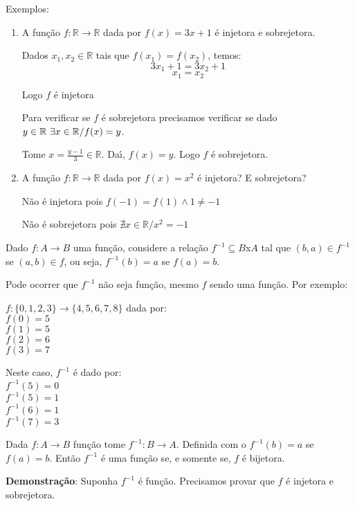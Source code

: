Exemplos:
\begin{enumerate}
\item A fun{\c c}{\~a}o $f:\mathbb{R}\rightarrow\mathbb{R}$ dada por $f(x)=3x+1$ {\'e} injetora e sobrejetora.

Dados $x_{1}, x_{2}\in\mathbb{R}$ tais que $f(x_{1})=f(x_{2})$, temos:
\[3x_{1}+1=3x_{2}+1\]
\[x_{1}=x_{2}\]

Logo $f$ {\'e} injetora

Para verificar se $f$ {\'e} sobrejetora precisamos verificar se dado $y\in\mathbb{R}\\ \ \exists x\in\mathbb{R}/f(x)=y$.

Tome $x=\displaystyle\frac{y-1}{3}\in\mathbb{R}$. Da{\'\i}, $f(x)=y$. Logo $f$ {\'e} sobrejetora.
\item A fun{\c c}{\~a}o $f:\mathbb{R}\rightarrow\mathbb{R}$ dada por $f(x)=x^{2}$ {\'e} injetora? E sobrejetora?

N{\~a}o {\'e} injetora pois $f(-1)=f(1)\wedge 1\neq -1$

N{\~a}o {\'e} sobrejetora pois $\nexists x\in\mathbb{R}/x^{2}=-1$

\end{enumerate}

Dado $f:A\rightarrow B$ uma fun{\c c}{\~a}o, considere a rela{\c c}{\~a}o $f^{-1}\subseteq B$x$A$ tal que $(b,a)\in f^{-1}$ se $(a,b)\in f$, ou seja, $f^{-1}(b)=a$ se $f(a)=b$.

Pode ocorrer que $f^{-1}$ n{\~a}o seja fun{\c c}{\~a}o, mesmo $f$ sendo uma fun{\c c}{\~a}o. Por exemplo:

$f:\{0,1,2,3\}\rightarrow\{4,5,6,7,8\}$ dada por:\\
$f(0)=5$\\
$f(1)=5$\\
$f(2)=6$\\
$f(3)=7$

Neste caso, $f^{-1}$ {\'e} dado por:\\
$f^{-1}(5)=0$\\
$f^{-1}(5)=1$\\
$f^{-1}(6)=1$\\
$f^{-1}(7)=3$

\begin{teorema} Dada $f:A\rightarrow B$ fun{\c c}{\~a}o tome $f^{-1}:B\rightarrow A$. Definida com o $f^{-1}(b)=a$ se $f(a)=b$. Ent{\~a}o $f^{-1}$ {\'e} uma fun{\c c}{\~a}o se, e somente se, $f$ {\'e} bijetora.\end{teorema}

\textbf{Demonstra{\c c}{\~a}o}: Suponha $f^{-1}$ {\'e} fun{\c c}{\~a}o. Precisamos provar que $f$ {\'e} injetora e sobrejetora.

